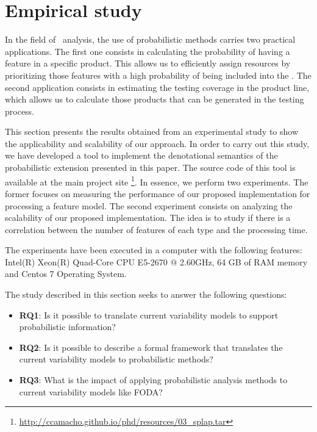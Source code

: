 
\section{Empirical study}
\label{sec:stat:impl}

In the field of \SPLs\ analysis, the use of probabilistic methods carries two practical applications.
The first one consists in calculating the probability of having a feature in a specific product.
This allows us to efficiently assign resources by prioritizing those features with a high probability
of being included into the \SPL. The second application consists in estimating the testing coverage 
in the product line, which allows us to calculate those products that can be generated in the testing process.

This section presents the results obtained from an experimental study to show the applicability and scalability of our
approach. In order to carry out this study, we have developed a tool to implement the denotational semantics of the
probabilistic extension presented in this paper. The source code of this tool is available at the main project site
\footnote{\url{http://ccamacho.github.io/phd/resources/03_splap.tar}}. In essence, we perform two experiments. 
The former focuses on measuring the performance of our proposed implementation for processing a feature model. 
The second experiment consists on analyzing the scalability of our proposed implementation. 
The idea is to study if there is a correlation between the number of features of each type and the 
processing time. 

The experiments have been executed in a computer with the following features: Intel(R) Xeon(R) Quad-Core 
CPU E5-2670 @ 2.60GHz, 64 GB of RAM memory and Centos 7 Operating System.

The study described in this section seeks to answer the following questions:

\begin{itemize}
	\item \textbf{RQ1}: Is it possible to translate current variability models to support probabilistic information?
	\item \textbf{RQ2}: Is it possible to describe a formal framework that translates the current variability models
	to probabilistic methods?
	\item \textbf{RQ3}: What is the impact of applying probabilistic analysis methods to current variability models like FODA?
\end{itemize}



